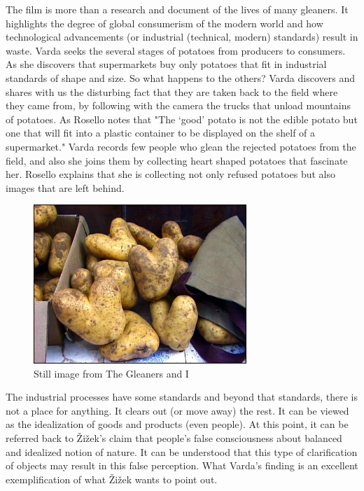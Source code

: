 The film is more than a research and document of the lives of many gleaners. It highlights the degree of global consumerism of the modern world and how technological advancements (or industrial (technical, modern) standards) result in waste. Varda seeks the several stages of potatoes from producers to consumers. As she discovers that supermarkets buy only potatoes that fit in industrial standards of shape and size. So what happens to the others? Varda discovers and shares with us the disturbing fact that they are taken back to the field where they came from, by following with the camera the trucks that unload mountains of potatoes. As Rosello notes that "The ‘good’ potato is not the edible potato but one that will fit into a plastic container to be displayed on the shelf of a supermarket." Varda records few people who glean the rejected potatoes from the field, and also she joins them by collecting heart shaped potatoes that fascinate her. Rosello explains that she is collecting not only refused potatoes but also images that are left behind.

\begin{figure}[h!]
  \centering
  \includegraphics[height=6cm]{graphics/AgnesVarda_Potatoes.jpg}
  \caption{Still image from The Gleaners and I}
  \label{fig:AgnesVarda_Potatoes}
\end{figure}

The industrial processes have some standards and beyond that standards, there is not a place for anything. It clears out (or move away) the rest. It can be viewed as the idealization of goods and products (even people). At this point, it can be referred back to Žižek's claim that people's false consciousness about balanced and idealized notion of nature. It can be understood that this type of clarification of objects may result in this false perception. What Varda's finding is an excellent exemplification of what Žižek wants to point out.

